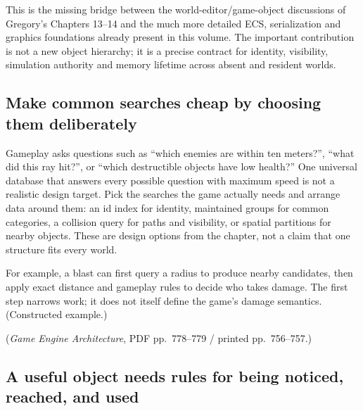 This is the missing bridge between the world-editor/game-object discussions of Gregory's Chapters 13--14 and the much more detailed ECS, serialization and graphics foundations already present in this volume. The important contribution is not a new object hierarchy; it is a precise contract for identity, visibility, simulation authority and memory lifetime across absent and resident worlds.

\subsection{Make common searches cheap by choosing them deliberately}\label{06-engine-ii-ch031-make-common-searches-cheap-by-choosing-them-deliberately}

\hypertarget{06-engine-ii-ch031-make-common-searches-cheap-by-choosing-them-deliberately}{}

Gameplay asks questions such as ``which enemies are within ten meters?'', ``what did this ray hit?'', or ``which destructible objects have low health?'' One universal database that answers every possible question with maximum speed is not a realistic design target. Pick the searches the game actually needs and arrange data around them: an id index for identity, maintained groups for common categories, a collision query for paths and visibility, or spatial partitions for nearby objects. These are design options from the chapter, not a claim that one structure fits every world.

For example, a blast can first query a radius to produce nearby candidates, then apply exact distance and gameplay rules to decide who takes damage. The first step narrows work; it does not itself define the game's damage semantics. (Constructed example.)

(\emph{Game Engine Architecture}, PDF pp.~778--779 / printed pp.~756--757.)

\subsection{A useful object needs rules for being noticed, reached, and used}\label{06-engine-ii-ch031-a-useful-object-needs-rules-for-being-noticed-reached-and-used}

\hypertarget{06-engine-ii-ch031-a-useful-object-needs-rules-for-being-noticed-reached-and-used}{}

